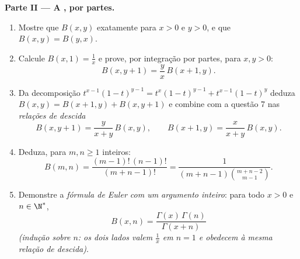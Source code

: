 \begin{problem}
\medskip
\noindent\textbf{Parte II --- A , por partes.}
\begin{enumerate}[resume]
  \item Mostre que $B(x,y)$  exatamente para $x > 0$ e $y >
        0$, e que $B(x,y) = B(y,x)$.
  \item Calcule $B(x, 1) = \frac1x$ e prove, por integração por
        partes, para $x, y > 0$:
        \[
        B(x, y+1) = \frac{y}{x}\,B(x+1, y) .
        \]
  \item Da decomposição $t^{x-1}(1-t)^{y-1} =
        t^{x}(1-t)^{y-1} + t^{x-1}(1-t)^{y}$ deduza $B(x,y) =
        B(x+1,y) + B(x,y+1)$ e combine com a questão 7 nas
        \emph{relações de descida}
        \[
        B(x, y+1) = \frac{y}{x+y}\,B(x,y),
        \qquad
        B(x+1, y) = \frac{x}{x+y}\,B(x,y) .
        \]
  \item Deduza, para $m, n \geq 1$ inteiros:
        \[
        B(m, n) = \frac{(m-1)!\,(n-1)!}{(m+n-1)!}
        = \frac{1}{(m+n-1)\binom{m+n-2}{m-1}} .
        \]
  \item Demonstre a \emph{fórmula de Euler com um argumento inteiro}:
        para todo $x > 0$ e $n \in \N^*$,
        \[
        B(x, n) = \frac{\Gamma(x)\,\Gamma(n)}{\Gamma(x + n)}
        \]
        \emph{(indução sobre $n$: os dois lados valem $\frac1x$ em $n
        = 1$ e obedecem à mesma relação de descida)}.
\end{enumerate}


\end{problem}

